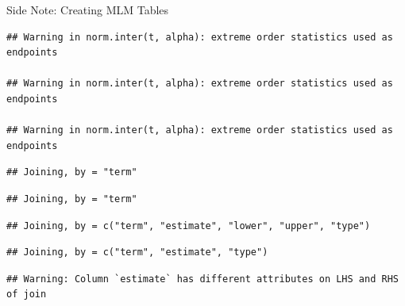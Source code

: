 \documentclass[ignorenonframetext,]{beamer}
\begin{document}
\begin{frame}[fragile]{Side Note: Creating MLM Tables}
\begin{verbatim}
## Warning in norm.inter(t, alpha): extreme order statistics used as endpoints

## Warning in norm.inter(t, alpha): extreme order statistics used as endpoints

## Warning in norm.inter(t, alpha): extreme order statistics used as endpoints
\end{verbatim}

\begin{verbatim}
## Joining, by = "term"
\end{verbatim}

\begin{verbatim}
## Joining, by = "term"
\end{verbatim}

\begin{verbatim}
## Joining, by = c("term", "estimate", "lower", "upper", "type")
\end{verbatim}

\begin{verbatim}
## Joining, by = c("term", "estimate", "type")
\end{verbatim}

\begin{verbatim}
## Warning: Column `estimate` has different attributes on LHS and RHS of join
\end{verbatim}

\end{frame}
\end{document}
